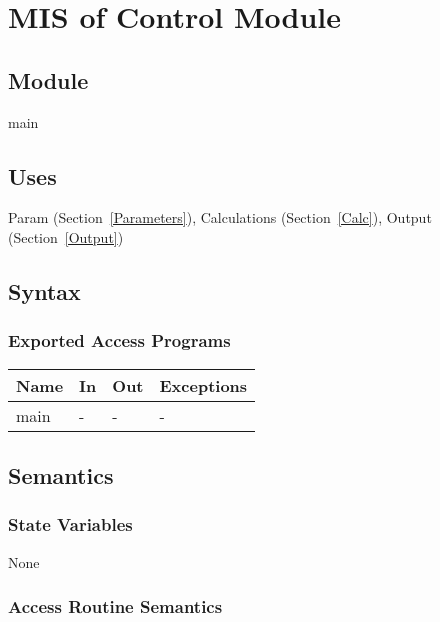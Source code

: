 \documentclass[12pt, titlepage]{article}
\begin{document}
\section{MIS of Control Module} \label{Main}

\subsection{Module}

main

\subsection{Uses}

Param (Section~\ref{Parameters}), Calculations (Section~\ref{Calc}),
Output (Section~\ref{Output})

\subsection{Syntax}

\subsubsection{Exported Access Programs}

\begin{center}
\begin{tabular}{p{2cm} p{4cm} p{4cm} p{2cm}}
\hline
\textbf{Name} & \textbf{In} & \textbf{Out} & \textbf{Exceptions} \\
\hline
main & - & - & - \\
\hline
\end{tabular}
\end{center}

\subsection{Semantics}

\subsubsection{State Variables}

None

\subsubsection{Access Routine Semantics}
\end{document}
